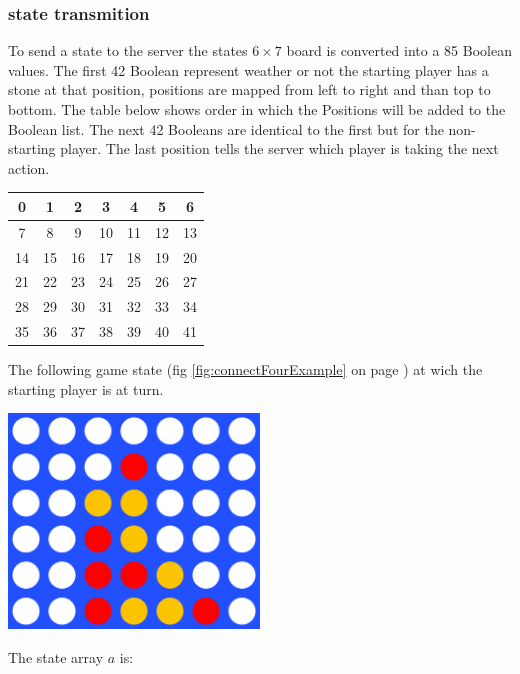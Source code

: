 \documentclass[12pt]{article}
\newcommand{\imgRef}[1]{(fig \ref{#1} on page \pageref{#1})}
\begin{document}
\subsubsection{state transmition}
To send a state to the server the states \(6 \times 7\) board is converted into a 85 Boolean values. The first 42 Boolean represent weather or not the starting player has a stone at that position, positions are mapped from left to right and than top to bottom. The table below shows order in which the Positions will be added to the Boolean list. The next 42 Booleans are identical to the first but for the non-starting player. The last position tells the server which player is taking the next action.
\begin{center}
\begin{tabular}{| c | c | c | c | c | c | c |}
 \hline
0 & 1 & 2 & 3 & 4 & 5 & 6  \\\hline
7 & 8 & 9 & 10 & 11 & 12 & 13\\\hline
14 & 15 & 16 & 17 & 18 & 19 & 20 \\\hline
21 & 22 & 23& 24 & 25 & 26 & 27 \\\hline
28 & 29 & 30 & 31 & 32 & 33 & 34 \\\hline
35 & 36 & 37 & 38 & 39 & 40 & 41 \\\hline
\end{tabular}
\end{center}
The following game state \imgRef{fig:connectFourExample} at wich the starting player is at turn.
\begin{center}
\includegraphics[width=0.5\textwidth]{connectFourExample}
\label{fig:connectFourExample}
\end{center}
The state array \(a\) is:
\end{document}
